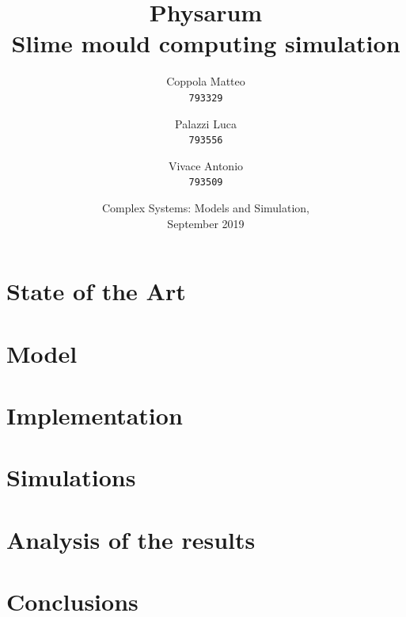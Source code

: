 \documentclass{report}
\begin{document}

\title{%
  \Huge Physarum\\
  \large Slime mould computing simulation\\
    }
\author{
  Coppola Matteo\\
  \texttt{793329}
  \and
  Palazzi Luca\\
  \texttt{793556}
   \and
  Vivace Antonio\\
  \texttt{793509}
}
\date{Complex Systems: Models and Simulation, \\ September 2019}
\maketitle


\tableofcontents
\listoffigures



\chapter{State of the Art}


\chapter{Model}


\chapter{Implementation}


\chapter{Simulations}


\chapter{Analysis of the results}

\chapter{Conclusions}



\end{document}
